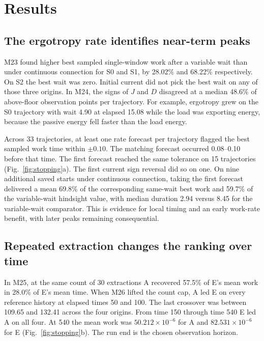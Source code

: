 \documentclass[11pt,a4paper]{article}
\begin{document}
\section{Results}
\label{sec:results}

\subsection{The ergotropy rate identifies near-term peaks}

M23 found higher best sampled single-window work after a variable wait than under continuous connection for S0 and S1, by 28.02\% and 68.22\% respectively. On S2 the best wait was zero. Initial current did not pick the best wait on any of those three origins. In M24, the signs of $J$ and $D$ disagreed at a median 48.6\% of above-floor observation points per trajectory. For example, ergotropy grew on the S0 trajectory with wait 4.90 at elapsed 15.08 while the load was exporting energy, because the passive energy fell faster than the load energy.

Across 33 trajectories, at least one rate forecast per trajectory flagged the best sampled work time within $\pm0.10$. The matching forecast occurred 0.08--0.10 before that time. The first forecast reached the same tolerance on 15 trajectories (Fig.~\ref{fig:stopping}a). The first current sign reversal did so on one. On nine additional saved starts under continuous connection, taking the first forecast delivered a mean 69.8\% of the corresponding same-wait best work and 59.7\% of the variable-wait hindsight value, with median duration 2.94 versus 8.45 for the variable-wait comparator. This is evidence for local timing and an early work-rate benefit, with later peaks remaining consequential.

\subsection{Repeated extraction changes the ranking over time}

In M25, at the same count of 30 extractions A recovered 57.5\% of E's mean work in 28.0\% of E's mean time. When M26 lifted the count cap, A led E on every reference history at elapsed times 50 and 100. The last crossover was between 109.65 and 132.41 across the four origins. From time 150 through time 540 E led A on all four. At 540 the mean work was $50.212\times10^{-6}$ for A and $82.531\times10^{-6}$ for E (Fig.~\ref{fig:stopping}b). The run end is the chosen observation horizon.
\end{document}
